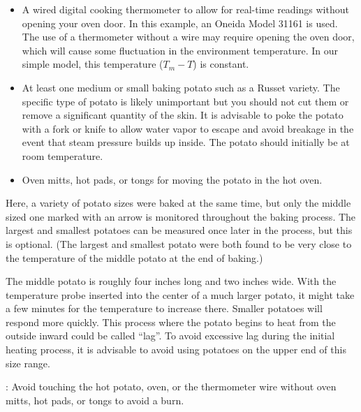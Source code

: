 \documentclass{ximera}
\begin{document}
\begin{itemize}
\item A wired digital cooking thermometer to allow for real-time readings without opening your oven door. In this example, an Oneida Model 31161 is used.  The use of a thermometer without a wire may require opening the oven door, which will cause some fluctuation in the environment temperature.  In our simple model, this temperature ($T_m-T$) is constant.
\item At least one medium or small baking potato such as a Russet variety. The specific type of potato is likely unimportant but you should not cut them or remove a significant quantity of the skin.  It is advisable to poke the potato with a fork or knife to allow water vapor to escape and avoid breakage in the event that steam pressure builds up inside.  The potato should initially be at room temperature.
\item Oven mitts, hot pads, or tongs for moving the potato in the hot oven.
\end{itemize}
 
Here, a variety of potato sizes were baked at the same time, but only the middle sized one marked with an arrow is monitored throughout the baking process.  The largest and smallest potatoes can be measured once later in the process, but this is optional.  (The largest and smallest potato were both found to be very close to the temperature of the middle potato at the end of baking.)
  
The middle potato is roughly four inches long and two inches wide.  With the temperature probe inserted into the center of a much larger potato, it might take a few minutes for the temperature to increase there.  Smaller potatoes will respond more quickly.  This process where the potato begins to heat from the outside inward could be called ``lag''.  To avoid excessive lag during the initial heating process, it is advisable to avoid using potatoes on the upper end of this size range.   
 
\begin{warning}: Avoid touching the hot potato, oven, or the thermometer wire without oven mitts, hot pads, or tongs to avoid a burn.
\end{warning}
 
\end{document}
